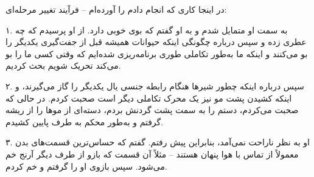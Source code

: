 در اینجا کاری که انجام دادم را آورده‌ام – فرآیند تغییر مرحله‌ای:

۱. به سمت او متمایل شدم و به او گفتم که بوی خوبی دارد. از او پرسیدم که چه عطری زده و سپس درباره چگونگی اینکه حیوانات همیشه قبل از جفت‌گیری یکدیگر را بو می‌کنند و اینکه ما به‌طور تکاملی طوری برنامه‌ریزی شده‌ایم که وقتی کسی ما را بو می‌کند تحریک شویم بحث کردیم.

۲. سپس درباره اینکه چطور شیرها هنگام رابطه جنسی یال یکدیگر را گاز می‌گیرند، و اینکه کشیدن پشت مو نیز یک محرک تکاملی دیگر است صحبت کردم. در حالی که صحبت می‌کردم، دستم را به سمت پشت گردنش بردم، دسته‌ای از موها را از ریشه گرفتم و به‌طور محکم به طرف پایین کشیدم.

۳. او به نظر ناراحت نمی‌آمد، بنابراین پیش رفتم. گفتم که حساس‌ترین قسمت‌های بدن معمولاً از تماس با هوا پنهان هستند – مثلاً آن قسمت که بازو از طرف دیگر آرنج خم می‌شود. سپس بازوی او را گرفتم و خم کردم.